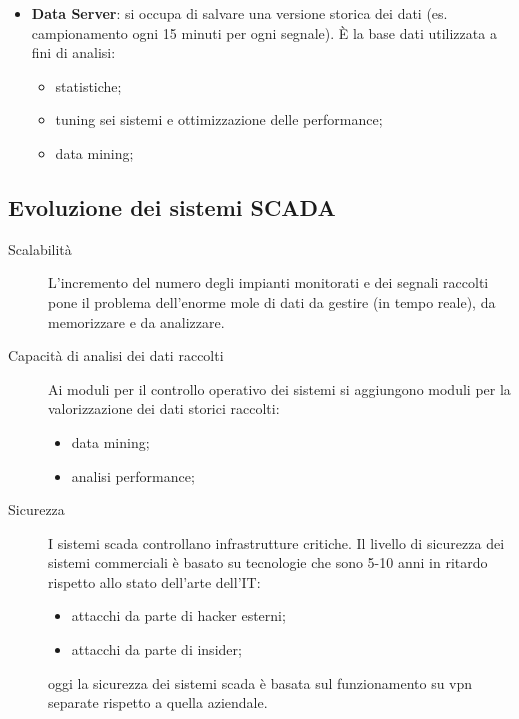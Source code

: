 \begin{itemize}
        Operano in tempo reale tipicamente utilizzando uno stream dati.
        Utilizza un database contenente una serie limitata di dati di dettaglio.
        Può supportare il controllo automatico tramite interfacce grafiche disposte in una control room, oppure può implementare regole di alerting automatiche;
    \item \textbf{Data Server}: si occupa di salvare una versione storica dei dati (es. campionamento ogni 15 minuti per ogni segnale).
        È la base dati utilizzata a fini di analisi:
        \begin{itemize}
            \item statistiche;
            \item tuning sei sistemi e ottimizzazione delle performance;
            \item data mining;
        \end{itemize}
\end{itemize}
%
\subsection{Evoluzione dei sistemi SCADA}\label{sub:evoluzione_dei_sistemi_scada} %
\begin{description}
    \item[Scalabilità] L'incremento del numero degli impianti monitorati e dei segnali raccolti pone il problema dell'enorme mole di dati da gestire (in tempo reale), da memorizzare e da analizzare.
    \item[Capacità di analisi dei dati raccolti] Ai moduli per il controllo operativo dei sistemi si aggiungono moduli per la valorizzazione dei dati storici raccolti:
        \begin{itemize}
            \item data mining;
            \item analisi performance;
        \end{itemize}
    \item[Sicurezza] I sistemi \ac{scada} controllano infrastrutture critiche.
        Il livello di sicurezza dei sistemi commerciali è basato su tecnologie che sono 5-10 anni in ritardo rispetto allo stato dell'arte dell'IT:
        \begin{itemize}
            \item attacchi da parte di hacker esterni;
            \item attacchi da parte di insider;
        \end{itemize}
        oggi la sicurezza dei sistemi \ac{scada} è basata sul funzionamento su \ac{vpn} separate rispetto a quella aziendale.
\end{description}
%
